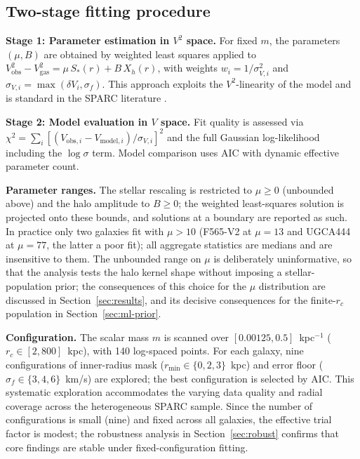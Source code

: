 \documentclass[11pt,a4paper]{article}
\begin{document}
\subsection{Two-stage fitting procedure}

\textbf{Stage 1: Parameter estimation in $V^2$ space.}
For fixed $m$, the parameters $(\mu, B)$ are obtained by weighted
least squares applied to
$V_{\mathrm{obs}}^2 - V_{\mathrm{gas}}^2 = \mu\,S_*(r) + B\,X_h(r)$,
with weights $w_i = 1/\sigma_{V,i}^2$ and
$\sigma_{V,i} = \max(\delta V_i, \sigma_f)$.
This approach exploits the $V^2$-linearity of the model and is
standard in the SPARC literature
\cite{Lelli:2016zqa,Li:2020iib,Lelli:2017vgz}.

\textbf{Stage 2: Model evaluation in $V$ space.}
Fit quality is assessed via
$\chi^2 = \sum_i [(V_{\mathrm{obs},i} - V_{\mathrm{model},i})/\sigma_{V,i}]^2$
and the full Gaussian log-likelihood including the $\log\sigma$ term.
Model comparison uses AIC with dynamic effective parameter count.

\textbf{Parameter ranges.}
The stellar rescaling is restricted to $\mu \geq 0$ (unbounded
above) and the halo amplitude to $B \geq 0$; the weighted
least-squares solution is projected onto these bounds, and
solutions at a boundary are reported as such.
In practice only two galaxies fit with $\mu > 10$ (F565-V2 at
$\mu = 13$ and UGCA444 at $\mu = 77$, the latter a poor fit);
all aggregate statistics are medians and are insensitive to them.
The unbounded range on $\mu$ is deliberately uninformative, so that
the analysis tests the halo kernel shape without imposing a
stellar-population prior; the consequences of this choice for
the $\mu$ distribution are discussed in
Section~\ref{sec:results}, and its decisive consequences for the
finite-$r_c$ population in Section~\ref{sec:ml-prior}.

\textbf{Configuration.}
The scalar mass $m$ is scanned over $[0.00125, 0.5]$~kpc$^{-1}$
($r_c \in [2, 800]$~kpc), with 140 log-spaced points.
For each galaxy, nine configurations of inner-radius mask
($r_{\min} \in \{0, 2, 3\}$~kpc) and error floor
($\sigma_f \in \{3, 4, 6\}$~km/s) are explored; the best
configuration is selected by AIC.
This systematic exploration accommodates the varying data quality
and radial coverage across the heterogeneous SPARC sample.
Since the number of configurations is small (nine) and fixed
across all galaxies, the effective trial factor is modest;
the robustness analysis in Section~\ref{sec:robust} confirms
that core findings are stable under fixed-configuration fitting.
\end{document}
